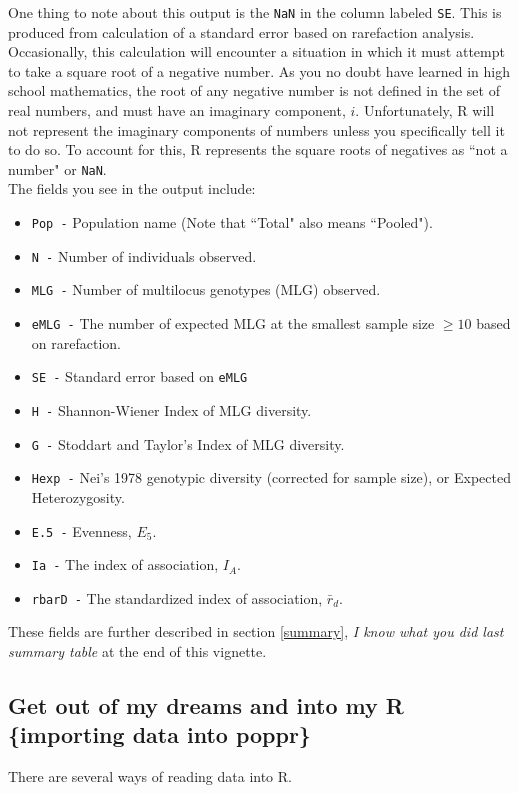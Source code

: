 \documentclass[letterpaper]{article}\usepackage[]{graphicx}\usepackage[]{color}
\begin{document}
One thing to note about this output is the \texttt{NaN} in the column labeled \texttt{SE}. This is produced from calculation of a standard error based on rarefaction analysis. Occasionally, this calculation will encounter a situation in which it must attempt to take a square root of a negative number. As you no doubt have learned in high school mathematics, the root of any negative number is not defined in the set of real numbers, and must have an imaginary component, $i$. Unfortunately, R will not represent the imaginary components of numbers unless you specifically tell it to do so. To account for this, R represents the square roots of negatives as ``not a number" or \texttt{NaN}.\\
The fields you see in the output include:
\begin{itemize}
  \item \texttt{Pop -} Population name (Note that ``Total" also means ``Pooled").
  \item \texttt{N -} Number of individuals observed.
  \item \texttt{MLG -} Number of multilocus genotypes (MLG) observed.
  \item \texttt{eMLG -} The number of expected MLG at the smallest sample size $\geq 10$ based on rarefaction. \cite{Hurlbert:1971}
  \item \texttt{SE -} Standard error based on \texttt{eMLG} \cite{Heck:1975}
  \item \texttt{H -} Shannon-Wiener Index of MLG diversity. \cite{Shannon:1948}
  \item \texttt{G -} Stoddart and Taylor's Index of MLG diversity. \cite{Stoddart:1988}
  \item \texttt{Hexp -} Nei's 1978 genotypic diversity (corrected for sample size), or  Expected Heterozygosity. \cite{Nei:1978}
  \item \texttt{E.5 -} Evenness, $E_5$. \cite{Pielou:1975}\cite{Ludwig:1988}\cite{Grunwald:2003}
  \item \texttt{Ia -} The index of association, $I_A$. \cite{Brown:1980} \cite{Smith:1993} \cite{Agapow:2001}
  \item \texttt{rbarD -} The standardized index of association, $\bar r_d$. \cite{Agapow:2001}
\end{itemize}

These fields are further described in section \ref{summary}, \textit{I know what you did last summary table} at the end of this vignette. 

\subsection{Get out of my dreams and into my R \{importing data into poppr\}}\label{intro:import}
There are several ways of reading data into R. 
\end{document}
